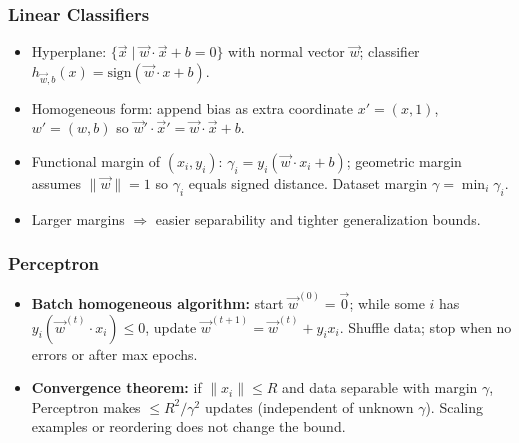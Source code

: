 \documentclass[10pt]{article}
\begin{document}
\begin{multicols}{2}
\subsubsection*{Linear Classifiers}
\begin{itemize}
    \item Hyperplane: $\{\vec{x}\mid \vec{w}\cdot\vec{x}+b=0\}$ with normal vector $\vec{w}$; classifier $h_{\vec{w},b}(x)=\mathrm{sign}(\vec{w}\cdot x + b)$.
    \item Homogeneous form: append bias as extra coordinate $x'=(x,1)$, $w'=(w,b)$ so $\vec{w}'\cdot \vec{x}'=\vec{w}\cdot\vec{x}+b$.
    \item Functional margin of $(x_i,y_i)$: $\gamma_i=y_i(\vec{w}\cdot x_i + b)$; geometric margin assumes $\|\vec{w}\|=1$ so $\gamma_i$ equals signed distance. Dataset margin $\gamma=\min_i \gamma_i$.
    \item Larger margins $\Rightarrow$ easier separability and tighter generalization bounds.
\end{itemize}

\subsubsection*{Perceptron}
\begin{itemize}
    \item \textbf{Batch homogeneous algorithm:} start $\vec{w}^{(0)}=\vec{0}$; while some $i$ has $y_i(\vec{w}^{(t)}\cdot x_i)\le0$, update $\vec{w}^{(t+1)}=\vec{w}^{(t)}+y_i x_i$. Shuffle data; stop when no errors or after max epochs.
    \item \textbf{Convergence theorem:} if $\|x_i\|\le R$ and data separable with margin $\gamma$, Perceptron makes $\le R^2/\gamma^2$ updates (independent of unknown $\gamma$). Scaling examples or reordering does not change the bound.
\end{itemize}


\end{multicols}
\end{document}
